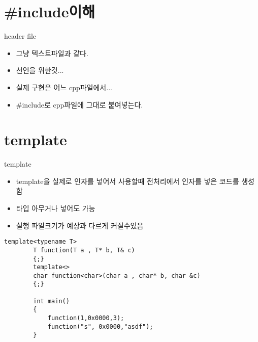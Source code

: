 \documentclass[10pt]{beamer}
\begin{document}
\begin{frame}{}
\end{frame}    

\begin{frame}{}
\end{frame}    

\begin{frame}{}
\end{frame}    


\section{#include이해}

\begin{frame}{header file}
    \begin{itemize}
        \item 그냥 텍스트파일과 같다.
        \item 선언을 위한것...
        \item 실제 구현은 어느 cpp파일에서...
        \item #include로 cpp파일에 그대로 붙여넣는다.
    \end{itemize}
\end{frame}

\section{template}

\begin{frame}{template}
    \begin{itemize}
        \item template을 실제로 인자를 넣어서 사용할때 전처리에서 인자를 넣은 코드를 생성함
        \item 타입 아무거나 넣어도 가능
        \item 실행 파일크기가 예상과 다르게 커질수있음
    \end{itemize}
\end{frame}    


\begin{frame}[fragile]{}
    \begin{lstlisting}[style = CStyle]
        template<typename T>
        T function(T a , T* b, T& c)
        {;}
        template<>
        char function<char>(char a , char* b, char &c)
        {;}

        int main()
        {
            function(1,0x0000,3);
            function("s", 0x0000,"asdf");
        }
    \end{lstlisting}
\end{frame}    
\end{document}
